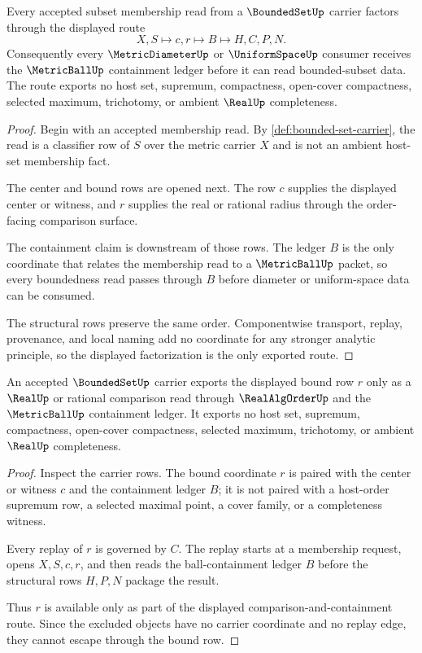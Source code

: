 \begin{theorem}
\label{thm:bounded-set-ball-containment-route}
Every accepted subset membership read from a $\BoundedSetUp$ carrier factors through the displayed route
$$
X,S \longmapsto c,r \longmapsto B \longmapsto H,C,P,N .
$$
Consequently every $\MetricDiameterUp$ or $\UniformSpaceUp$ consumer receives the $\MetricBallUp$ containment ledger before it can read bounded-subset data. The route exports no host set, supremum, compactness, open-cover compactness, selected maximum, trichotomy, or ambient $\RealUp$ completeness.
\end{theorem}
\begin{proof}
Begin with an accepted membership read. By \autoref{def:bounded-set-carrier}, the read is a classifier row of $S$ over the metric carrier $X$ and is not an ambient host-set membership fact.

The center and bound rows are opened next. The row $c$ supplies the displayed center or witness, and $r$ supplies the real or rational radius through the order-facing comparison surface.

The containment claim is downstream of those rows. The ledger $B$ is the only coordinate that relates the membership read to a $\MetricBallUp$ packet, so every boundedness read passes through $B$ before diameter or uniform-space data can be consumed.

The structural rows preserve the same order. Componentwise transport, replay, provenance, and local naming add no coordinate for any stronger analytic principle, so the displayed factorization is the only exported route.
\end{proof}

\begin{theorem}
\label{thm:bounded-set-real-bound-nonescape}
An accepted $\BoundedSetUp$ carrier exports the displayed bound row $r$ only as a $\RealUp$ or rational comparison read through $\RealAlgOrderUp$ and the $\MetricBallUp$ containment ledger. It exports no host set, supremum, compactness, open-cover compactness, selected maximum, trichotomy, or ambient $\RealUp$ completeness.
\end{theorem}
\begin{proof}
Inspect the carrier rows. The bound coordinate $r$ is paired with the center or witness $c$ and the containment ledger $B$; it is not paired with a host-order supremum row, a selected maximal point, a cover family, or a completeness witness.

Every replay of $r$ is governed by $C$. The replay starts at a membership request, opens $X,S,c,r$, and then reads the ball-containment ledger $B$ before the structural rows $H,P,N$ package the result.

Thus $r$ is available only as part of the displayed comparison-and-containment route. Since the excluded objects have no carrier coordinate and no replay edge, they cannot escape through the bound row.
\end{proof}

